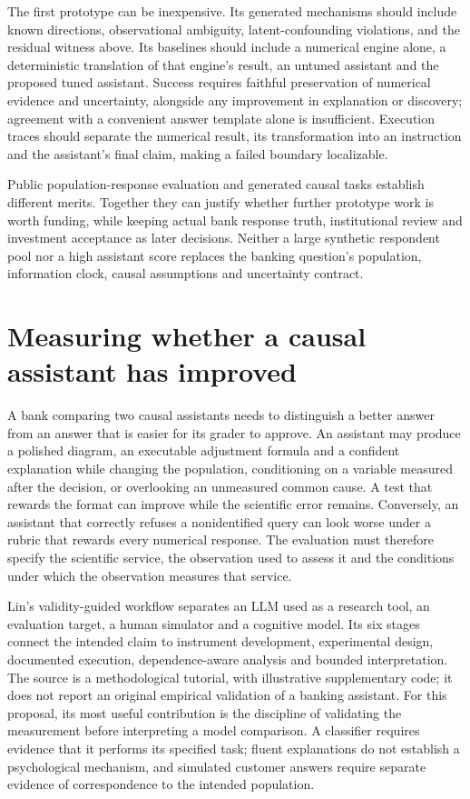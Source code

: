 The first prototype can be inexpensive. Its generated mechanisms should
include known directions, observational ambiguity, latent-confounding
violations, and the residual witness above. Its baselines should include a
numerical engine alone, a deterministic translation of that engine's result,
an untuned assistant and the proposed tuned assistant. Success requires
faithful preservation of numerical evidence and uncertainty, alongside any
improvement in explanation or discovery; agreement with a convenient answer
template alone is insufficient. Execution traces should separate the numerical
result, its transformation into an instruction and the assistant's final
claim, making a failed boundary localizable.

Public population-response evaluation and generated causal tasks establish
different merits. Together they can justify whether further prototype work is
worth funding, while keeping actual bank response truth, institutional review
and investment acceptance as later decisions. Neither a large synthetic
respondent pool nor a high assistant score replaces the banking question's
population, information clock, causal assumptions and uncertainty contract.


\section{Measuring whether a causal assistant has improved}
\label{exec20:validity-scope}

A bank comparing two causal assistants needs to distinguish a better answer
from an answer that is easier for its grader to approve. An assistant may
produce a polished diagram, an executable adjustment formula and a confident
explanation while changing the population, conditioning on a variable measured
after the decision, or overlooking an unmeasured common cause. A test that
rewards the format can improve while the scientific error remains. Conversely,
an assistant that correctly refuses a nonidentified query can look worse under
a rubric that rewards every numerical response. The evaluation must therefore
specify the scientific service, the observation used to assess it and the
conditions under which the observation measures that service.

Lin's validity-guided workflow separates an LLM used as a research tool, an
evaluation target, a human simulator and a cognitive model. Its six stages
connect the intended claim to instrument development, experimental design,
documented execution, dependence-aware analysis and bounded interpretation.
The source is a methodological tutorial, with illustrative supplementary code;
it does not report an original empirical validation of a banking assistant.
For this proposal, its most useful contribution is the discipline of validating
the measurement before interpreting a model comparison. A classifier requires
evidence that it performs its specified task; fluent explanations do not
establish a psychological mechanism, and simulated customer answers require
separate evidence of correspondence to the intended population.
\citep{exec20_validity}

